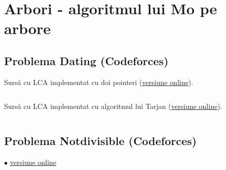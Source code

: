 \documentclass[../main.tex]{subfiles}
\begin{document}
\chapter{Arbori - algoritmul lui Mo pe arbore}

\section{Problema Dating (Codeforces)}
\label{code:dating}

Sursă cu LCA implementat cu doi pointeri (\href{https://codeforces.com/contest/852/submission/297086492}{versiune online}).

\inputminted{cpp}{../src/trees/dating-two-pointer.cpp}

Sursă cu LCA implementat cu algoritmul lui Tarjan (\href{https://codeforces.com/contest/852/submission/297037077}{versiune online}).

\inputminted{cpp}{../src/trees/dating-tarjan.cpp}

\section{Problema Notdivisible (Codeforces)}
\label{code:notdivisible}
$\bullet$
\href{https://kilonova.ro/submissions/889493}{versiune online}

\inputminted{cpp}{../src/trees/notdivisible.cpp}
\end{document}
